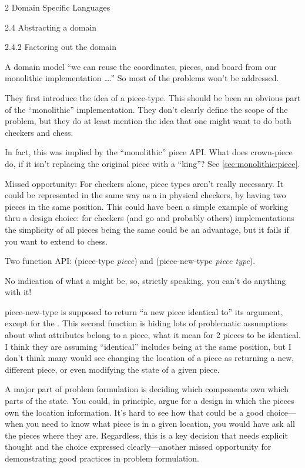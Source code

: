 \documentclass[12pt]{PalisadesLakesBook}
\begin{document}
\begin{plSection}{2 Domain Specific Languages}
\begin{plSection}{2.4 Abstracting a domain}
\begin{plSection}{2.4.2 Factoring out the domain}
\begin{plSection}{A domain model}
``we can reuse the coordinates, pieces, and board from our
monolithic implementation {\ldots}.''
So most of the problems won't be addressed.

They first introduce the idea of a {\schemeFont piece-type}.
This should be been an obvious part of the ``monolithic''
implementation. 
They don't clearly define the scope of the
problem, but they do at least mention the idea that 
one might want to do both checkers and chess.

In fact, this was implied by the ``monolithic'' piece API.
What does {\schemeFont crown-piece} do, if it isn't replacing
the original piece with a ``king''?
See \cref{sec:monolithic:piece}.

Missed opportunity:
For checkers alone, piece types aren't really necessary.
It could be represented in the same way as a in physical checkers,
by having two pieces in the same position.
This could have been a simple example of working thru a design
choice: for checkers (and go and probably others)
implementations the simplicity
of all pieces being the same could be an advantage,
but it fails if you want to extend to chess.

Two function API:
{\schemeFont (piece-type {\itshape piece})}
and {\schemeFont (piece-new-type {\itshape piece type})}.

No indication of what a {} might be,
so, strictly speaking, you can't do anything with it!

{\schemeFont piece-new-type} is supposed to return 
``a new piece identical to'' its argument, except for the 
 {}.
This second function is hiding lots of problematic assumptions
about what attributes belong to a piece, what it mean for 2 pieces
to be identical. 
I think they are assuming ``identical'' includes being at the
same position, but I don't think many would see changing the
location of a piece as returning a new, different piece,
or even modifying the state of a given piece.

A major part of problem formulation is deciding which components
own which parts of the state.
You could, in principle, argue for a design in which the pieces
own the location information. 
It's hard to see how that could be a good choice---when you need 
to know what piece is in a given location, you would have 
ask all the pieces where they are.
Regardless, this is a key decision that needs explicit
thought and the choice expressed clearly---another missed
opportunity for demonstrating good practices in problem
formulation.


\end{plSection}
\end{plSection}
\end{plSection}
\end{plSection}
\end{document}
